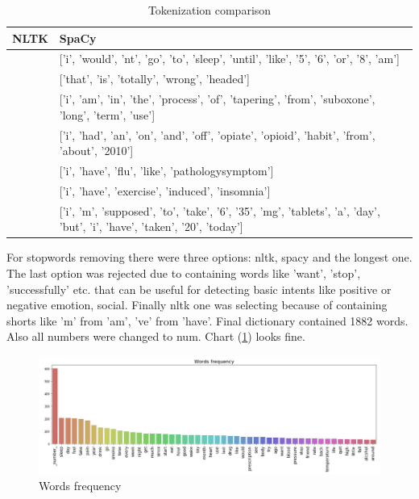 \documentclass[11pt]{article}
\begin{document}
\begin{center}
\begin{table}
\begin{tabular}{ |p{7cm}|p{7cm}| }
\hline
NLTK & SpaCy \\ \hline
['i', 'wouldnt', 'go', 'to', 'sleep', 'until', 'like', '5', '6', 'or', '8am'] & 
['i', 'would', 'nt', 'go', 'to', 'sleep', 'until', 'like', '5', '6', 'or', '8', 'am'] \\ \hline
['that', 'is', 'totally', 'wrongheaded'] & ['that', 'is', 'totally', 'wrong', 'headed'] \\ \hline
['i', 'am', 'in', 'the', 'process', 'of', 'tapering', 'from', 'suboxone', 'longterm', 'use'] & 
['i', 'am', 'in', 'the', 'process', 'of', 'tapering', 'from', 'suboxone', 'long', 'term', 'use'] \\ \hline
['i', 'had', 'an', 'onandoff', 'opiateopioid', 'habit', 'from', 'about', '2010'] & 
['i', 'had', 'an', 'on', 'and', 'off', 'opiate', 'opioid', 'habit', 'from', 'about', '2010'] \\ 
\hline
['i', 'have', 'flulike', 'pathologysymptom'] & ['i', 'have', 'flu', 'like', 'pathologysymptom'] \\ \hline
['i', 'have', 'exerciseinduced', 'insomnia'] & ['i', 'have', 'exercise', 'induced', 'insomnia'] \\ \hline
['i', 'm', 'supposed', 'to', 'take', '6', '35mg', 'tablets', 'a', 'day', 'but', 'i', 'have', 'taken', '20', 'today'] & 
['i', 'm', 'supposed', 'to', 'take', '6', '35', 'mg', 'tablets', 'a', 'day', 'but', 'i', 'have', 'taken', '20', 'today'] \\ 
\hline
\end{tabular}	
\caption{\label{token_dif}Tokenization comparison}
\end{table}
\end{center}
\FloatBarrier

For stopwords removing there were three options: nltk, spacy and the longest one. The last option was rejected due to containing words like 'want', 'stop', 'successfully' etc. that can be useful for detecting basic intents like positive or negative emotion, social. Finally nltk one was selecting because of containing shorts like 'm' from 'am', 've' from 'have'. Final dictionary contained 1882 words. Also all numbers were changed to num. Chart (\ref{words_freq}) looks fine.

 \begin{figure}[h]
 	\centering
 	\includegraphics[scale=0.4]{report2.png}
	\caption{Words frequency}
 \label{words_freq}
 \end{figure}
\FloatBarrier
\end{document}
